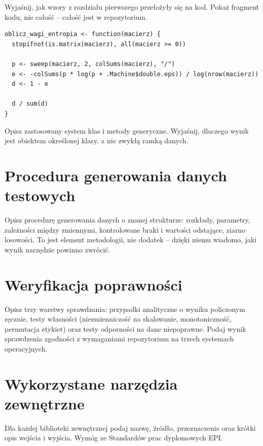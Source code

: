 Wyjaśnij, jak wzory z rozdziału pierwszego przełożyły się na kod. Pokaż fragment kodu, nie całość – całość jest w repozytorium.

\begin{lstlisting}[caption={Wyznaczanie wag metoda entropii},label={lst:wagi}]
oblicz_wagi_entropia <- function(macierz) {
  stopifnot(is.matrix(macierz), all(macierz >= 0))

  p <- sweep(macierz, 2, colSums(macierz), "/")
  e <- -colSums(p * log(p + .Machine$double.eps)) / log(nrow(macierz))
  d <- 1 - e

  d / sum(d)
}
\end{lstlisting}

Opisz zastosowany system klas i metody generyczne. Wyjaśnij, dlaczego wynik jest obiektem określonej klasy, a nie zwykłą ramką danych.

\section{Procedura generowania danych testowych}

Opisz procedurę generowania danych o znanej strukturze: rozkłady, parametry, zależności między zmiennymi, kontrolowane braki i wartości odstające, ziarno losowości. To jest element metodologii, nie dodatek – dzięki niemu wiadomo, jaki wynik narzędzie powinno zwrócić.

\section{Weryfikacja poprawności}

Opisz trzy warstwy sprawdzania: przypadki analityczne o wyniku policzonym ręcznie, testy własności (niezmienniczość na skalowanie, monotoniczność, permutacja etykiet) oraz testy odporności na dane niepoprawne. Podaj wynik sprawdzenia zgodności z wymaganiami repozytorium na trzech systemach operacyjnych.

\section{Wykorzystane narzędzia zewnętrzne}

Dla każdej biblioteki zewnętrznej podaj nazwę, źródło, przeznaczenie oraz krótki opis wejścia i wyjścia. Wymóg ze Standardów prac dyplomowych EPI.
